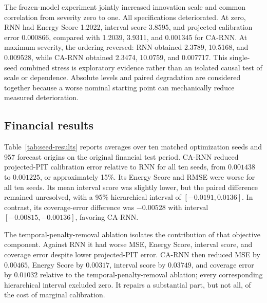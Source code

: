 \documentclass[11pt]{article}
\begin{document}
The frozen-model experiment jointly increased innovation scale and common
correlation from severity zero to one. All specifications deteriorated. At zero,
RNN had Energy Score 1.2022, interval score 3.8595, and projected calibration
error 0.000866, compared with 1.2039, 3.9311, and 0.001345 for CA-RNN.
At maximum severity, the ordering reversed: RNN obtained 2.3789, 10.5168, and
0.009528, while CA-RNN obtained 2.3474, 10.0759, and 0.007717. This
single-seed combined stress is exploratory evidence rather than an isolated
causal test of scale or dependence. Absolute levels and paired degradation are
considered together because a worse nominal starting point can mechanically
reduce measured deterioration.

\subsection{Financial results}

Table~\ref{tab:seed-results} reports averages over ten matched optimization seeds
and 957 forecast origins on the original financial test period. CA-RNN
reduced projected-PIT calibration error relative to RNN for all ten seeds, from
$0.001438$ to $0.001225$, or approximately 15\%. Its Energy Score and RMSE were
worse for all ten seeds. Its mean interval score was slightly lower, but the
paired difference remained unresolved, with a 95\% hierarchical interval of
$[-0.0191,0.0136]$. In contrast, its coverage-error difference was $-0.00528$
with interval $[-0.00815,-0.00136]$, favoring CA-RNN.

\begin{table}[ht]
\centering
\caption{Mean financial performance over ten matched optimization seeds. Lower
is better except for coverage, whose nominal target is 0.90.}
\label{tab:seed-results}
\end{table}

The temporal-penalty-removal ablation isolates the contribution of that objective
component. Against RNN it had worse MSE,
Energy Score, interval score, and coverage error despite lower projected-PIT
error. CA-RNN then reduced MSE by $0.00465$, Energy Score by
$0.00317$, interval score by $0.03749$, and coverage error by $0.01032$ relative
to the temporal-penalty-removal ablation; every corresponding hierarchical
interval excluded zero. It repairs a
substantial part, but not all, of the cost of marginal calibration.
\end{document}

